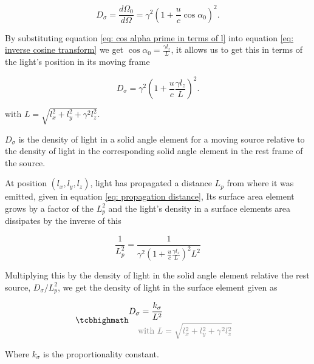 \begin{derivation}
	\begin{equation}
		D_{\sigma} = \frac{d\Omega_0}{d\Omega} = {\gamma}^2\left(1 + \dfrac{u}{c}\cos{\alpha_0}\right)^2.
	\end{equation}

	By substituting equation \eqref{eq: cos alpha prime in terms of l} into equation \eqref{eq: inverse cosine transform} we get $\cos\alpha_0=\frac{\gamma l_{z}}{L}$, it allows us to get this in terms of the light's position in its moving frame

	\begin{equation}
		D_{\sigma} = {\gamma}^2\left(1 + \dfrac{u}{c}\frac{\gamma l_{z}}{L}\right)^2.
	\end{equation}

	with $L = \sqrt{l^2_{x} + l^2_{y} + \gamma^2 l^2_{z}}$.

	$D_{\sigma}$ is the density of light in a solid angle element for a moving source relative to the density of light in the corresponding solid angle element in the rest frame of the source.

\end{derivation}

At position $(l_{x},l_{y},l_{z})$, light has propagated a distance $L_p$ from where it was emitted, given in equation \eqref{eq: propagation distance},
Its surface area element grows by a factor of the $L_p^2$ and the light's density in a surface elements area dissipates by the inverse of this

\begin{equation}
	\frac{1}{L_p^2} = \frac{1}{\gamma^2 \left( 1 + \frac{u}{c} \frac{\gamma l_z}{L} \right)^2 L^2}
\end{equation}

Multiplying this by the density of light in the solid angle element relative the rest source, $D_{\sigma}/L_p^2$, we get the density of light in the surface element given as

\begin{equation}
	\label{eq: denisty of light in surface element}
	\mhl{
		\begin{aligned}
			D_{\sigma} = \frac{k_{\sigma}}{L^2}                                                     \\
			\color{gray} \text{with } L & \color{gray}= \sqrt{l^2_{x} + l^2_{y} + \gamma^2 l^2_{z}}
		\end{aligned}
	}
\end{equation}

Where $k_{\sigma}$ is the proportionality constant.

